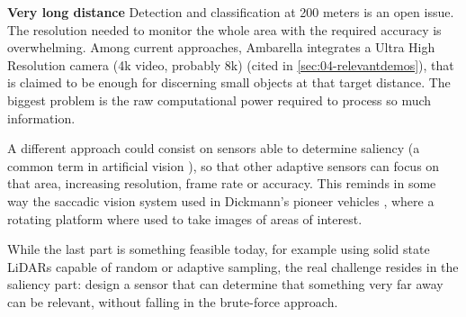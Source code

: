 \textbf{Very long distance} 
    Detection and classification at 200 meters is an open issue.
    The resolution needed to monitor the whole area with the required 
    accuracy is overwhelming. Among current approaches, Ambarella 
    integrates a Ultra High Resolution camera (4k video, probably 8k) 
    (cited in \ref{sec:04-relevantdemos}), that is claimed to be enough for 
    discerning small objects at that target distance. The biggest problem
    is the raw computational power required to process so much information.
    
    A different approach could consist on sensors able to determine 
    saliency (a common term in artificial vision 
    \cite{Zhang2016a,Palazzi2018,Duthon2016}), 
    so that other adaptive sensors can focus on that area, increasing
    resolution, frame rate or accuracy. 
    This reminds in some way the saccadic vision system used in Dickmann's 
    pioneer vehicles \cite{Dickmanns1987,Gregor2002}, where a rotating 
    platform where used to take images of areas of interest.
    
    While the last part is something feasible today, for example using solid
    state LiDARs capable of random or adaptive sampling, the real challenge
    resides in the saliency part: design a sensor that can determine that 
    something very far away can be relevant, without falling in the
    brute-force approach.
    
%        
%        

